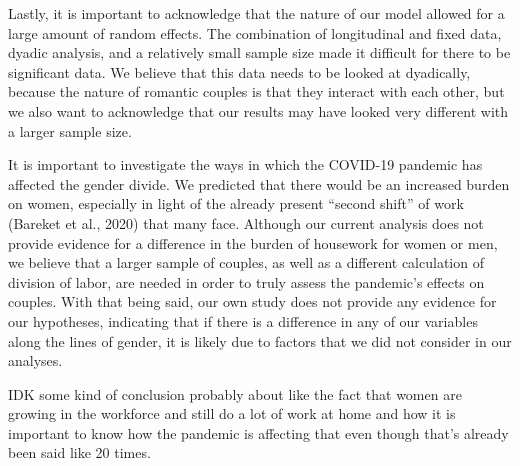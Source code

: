 \documentclass[
  man]{apa6}
\begin{document}
Lastly, it is important to acknowledge that the nature of our model allowed for a large amount of random effects. The combination of longitudinal and fixed data, dyadic analysis, and a relatively small sample size made it difficult for there to be significant data. We believe that this data needs to be looked at dyadically, because the nature of romantic couples is that they interact with each other, but we also want to acknowledge that our results may have looked very different with a larger sample size.

It is important to investigate the ways in which the COVID-19 pandemic has affected the gender divide. We predicted that there would be an increased burden on women, especially in light of the already present ``second shift'' of work (Bareket et al., 2020) that many face. Although our current analysis does not provide evidence for a difference in the burden of housework for women or men, we believe that a larger sample of couples, as well as a different calculation of division of labor, are needed in order to truly assess the pandemic's effects on couples. With that being said, our own study does not provide any evidence for our hypotheses, indicating that if there is a difference in any of our variables along the lines of gender, it is likely due to factors that we did not consider in our analyses.

IDK some kind of conclusion probably about like the fact that women are growing in the workforce and still do a lot of work at home and how it is important to know how the pandemic is affecting that even though that's already been said like 20 times.
\end{document}
